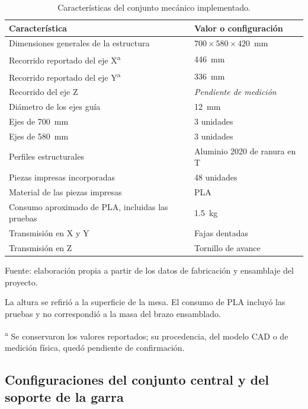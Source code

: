\begin{table}[H]
    \centering
    \caption{Características del conjunto mecánico implementado.}
    \label{tab:fase3_caracteristicas}
    \begin{tabular}{p{}p{}}
        \hline
        Característica & Valor o configuración \\
        \hline
        Dimensiones generales de la estructura & $700 \times 580 \times 420$~mm \\
        Recorrido reportado del eje X\textsuperscript{a} & 446~mm \\
        Recorrido reportado del eje Y\textsuperscript{a} & 336~mm \\
        Recorrido del eje Z & \textit{Pendiente de medición} \\
        Diámetro de los ejes guía & 12~mm \\
        Ejes de 700~mm & 3 unidades \\
        Ejes de 580~mm & 3 unidades \\
        Perfiles estructurales & Aluminio 2020 de ranura en T \\
        Piezas impresas incorporadas & 48 unidades \\
        Material de las piezas impresas & PLA \\
        Consumo aproximado de PLA, incluidas las pruebas & 1.5~kg \\
        Transmisión en X y Y & Fajas dentadas \\
        Transmisión en Z & Tornillo de avance \\
        \hline
    \end{tabular}
    \par\small\raggedright Fuente: elaboración propia a partir de los datos de fabricación y ensamblaje del proyecto.
    \par\small La altura se refirió a la superficie de la mesa. El consumo de PLA incluyó las pruebas y no correspondió a la masa del brazo ensamblado.
    \par\small\textsuperscript{a} Se conservaron los valores reportados; su procedencia, del modelo CAD o de medición física, quedó pendiente de confirmación.
\end{table}

\subsection{Configuraciones del conjunto central y del soporte de la garra}

